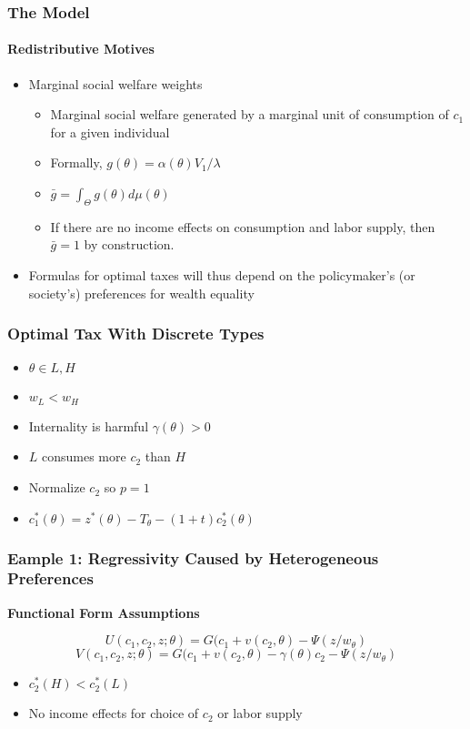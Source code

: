 \documentclass{beamer}
\begin{document}
\begin{frame}
\frametitle{The Model}
\framesubtitle{Redistributive Motives}
\begin{itemize}
	\item Marginal social welfare weights 
	\begin{itemize}
		\item Marginal social welfare generated by a marginal unit of consumption of $c_1$ for a given individual 
		\item Formally, $g(\theta) = \alpha(\theta)V_1/\lambda$
		\item $\bar{g} = \int_{\Theta}^{}g(\theta)d\mu(\theta)$
		\item If there are no income effects on consumption and labor
		supply, then $\bar{g} =1$ by construction.
	\end{itemize}
\item Formulas for optimal taxes will thus depend on the policymaker’s (or society’s) preferences for wealth equality
	
\end{itemize}

\end{frame}






\begin{frame}
\frametitle{Optimal Tax With Discrete Types}

\begin{itemize}
	\item $\theta \in {L,H}$
	\item $w_L < w_H$
	\item Internality  is harmful $\gamma(\theta) > 0$
	\item $L$ consumes more $c_2$ than $H$
	\item Normalize $c_2$ so $p=1$
	\item $c_1^*(\theta) = z^*(\theta) - T_{\theta} - (1+t)c_2^*(\theta)$
	
\end{itemize}

\end{frame}






\begin{frame}
\frametitle{Eample 1: Regressivity Caused by Heterogeneous Preferences   }

\textbf{Functional Form Assumptions}

$$ U(c_1, c_2,z;\theta) = G(c_1 + v(c_2, \theta) - \Psi(z/w_{\theta}) $$
$$ V(c_1, c_2,z;\theta) = G(c_1 + v(c_2, \theta) - \gamma(\theta)c_2 - \Psi(z/w_{\theta})
$$
\begin{itemize}
	\item $c_2^*(H) < c_2^*(L)$
	\item No income effects for choice of $c_2$ or labor supply 
\end{itemize}
\end{frame}
	
\end{document}
